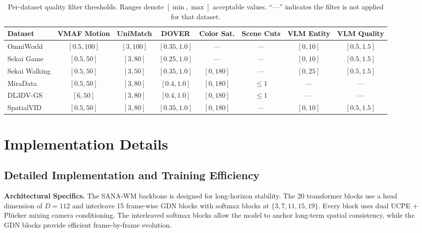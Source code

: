 \documentclass{llmxive}
\providecommand{\modelname}{SANA-WM\xspace}
\begin{document}
\begin{table}[htbp]
\centering
\scriptsize
\begin{tabular}{@{}lccccccc@{}}
\toprule
\textbf{Dataset} & \textbf{VMAF Motion} & \textbf{UniMatch} & \textbf{DOVER} & \textbf{Color Sat.} & \textbf{Scene Cuts} & \textbf{VLM Entity} & \textbf{VLM Quality} \\
\midrule
OmniWorld       & $[0.5, 100]$ & $[3, 100]$ & $[0.35, 1.0]$ & ---          & ---    & $[0, 10]$  & $[0.5, 1.5]$ \\
Sekai Game      & $[0.5, 50]$  & $[3, 80]$  & $[0.25, 1.0]$ & ---          & ---    & $[0, 10]$  & $[0.5, 1.5]$ \\
Sekai Walking   & $[0.5, 50]$  & $[3, 50]$  & $[0.35, 1.0]$ & $[0, 180]$   & ---    & $[0, 25]$  & $[0.5, 1.5]$ \\
MiraData        & $[0.5, 50]$  & $[3, 80]$  & $[0.4, 1.0]$  & $[0, 180]$   & $\leq 1$ & ---        & --- \\
DL3DV-GS        & $[6, 50]$    & $[3, 80]$  & $[0.4, 1.0]$  & $[0, 180]$   & $\leq 1$ & ---        & --- \\
SpatialVID      & $[0.5, 50]$  & $[3, 80]$  & $[0.35, 1.0]$ & $[0, 180]$   & ---    & $[0, 10]$  & $[0.5, 1.5]$ \\
\bottomrule
\end{tabular}
\caption{Per-dataset quality filter thresholds. Ranges denote $[\min, \max]$ acceptable values. ``---'' indicates the filter is not applied for that dataset.}
\label{tab:filter_thresholds}
\end{table}
















\section{Implementation Details}
\label{sec:appendix}

\subsection{Detailed Implementation and Training Efficiency}
\label{sec:impl_details_appendix}

\noindent \textbf{Architectural Specifics.}
The \modelname backbone is designed for long-horizon stability. The 20 transformer blocks use a head dimension of $D{=}112$ and interleave 15 frame-wise GDN blocks with softmax blocks at $\{3,7,11,15,19\}$. Every block uses dual UCPE + Pl\"ucker mixing camera conditioning. The interleaved softmax blocks allow the model to anchor long-term spatial consistency, while the GDN blocks provide efficient frame-by-frame evolution.
\end{document}
